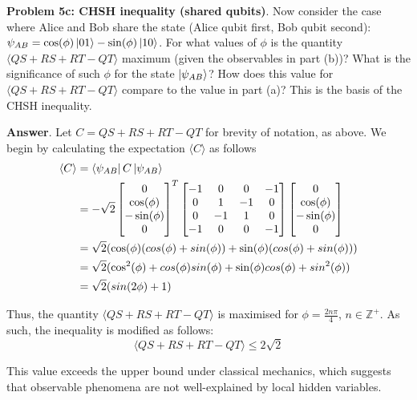 \textbf{Problem 5c: CHSH inequality (shared qubits)}. Now consider the case where Alice and Bob share the state (Alice qubit first, Bob qubit second): $\psi_{AB} = \cos(\phi)\ket{01} - \sin(\phi)\ket{10}$. 
For what values of $\phi$ is the quantity $\langle QS + RS + RT - QT\rangle$ maximum (given the observables in part (b))? 
What is the significance of such $\phi$ for the state $\ket{\psi_{AB}}$? 
How does this value for $\langle QS + RS + RT - QT\rangle$ compare to the value in part (a)? 
This is the basis of the CHSH inequality.


\textbf{Answer}. Let $C = QS + RS + RT - QT$ for brevity of notation, as above. 
We begin by calculating the expectation $\langle C\rangle$ as follows
\begin{align*}
	\langle C \rangle &= \bra{\psi_{AB}} C \ket{\psi_{AB}}	\\
	&= -\sqrt{2}
	\begin{bmatrix}
		0 \\
		\cos(\phi)\\
		-\sin(\phi) \\
		0
	\end{bmatrix}^T
	\begin{bmatrix}
		-1	&	0	&	0	&	-1	\\
		0	&	1	&	-1	&	0	\\
		0	&	-1	&	1	&	0	\\
		-1	&	0	&	0	&	-1	
	\end{bmatrix} 
	\begin{bmatrix}
		0 \\
		\cos(\phi)\\
		-\sin(\phi) \\
		0
	\end{bmatrix} \\
	&=\sqrt{2}(
		\cos(\phi)(cos(\phi) + sin(\phi)) +
		\sin(\phi)(cos(\phi) + sin(\phi))
	)\\
	&=\sqrt{2}(
		\cos^2(\phi) + cos(\phi)sin(\phi) +
		\sin(\phi)cos(\phi) + sin^2(\phi)
	)\\
	&= \sqrt{2}(sin(2\phi) + 1)
\end{align*}

Thus, the quantity $\langle QS + RS + RT - QT\rangle$ is maximised for $\phi = \frac{2n\pi}{4}$, $n \in \mathbb{Z}^+$. 
As such, the inequality is modified as follows:
\begin{equation*}
	\langle QS + RS + RT - QT \rangle \leq 2\sqrt{2}
\end{equation*}

This value exceeds the upper bound under classical mechanics, which suggests that observable phenomena are not well-explained by local hidden variables.

